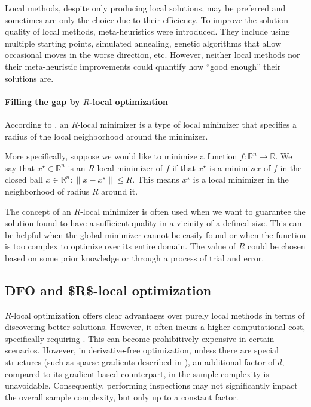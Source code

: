 Local methods, despite only producing local solutions, may be preferred and sometimes are only the choice due to their efficiency. 
To improve the solution quality of local methods, meta-heuristics were introduced. They include using multiple starting points, simulated annealing, genetic algorithms that allow occasional moves in the worse direction, etc.
However, neither local methods nor their meta-heuristic improvements could quantify how ``good enough'' their solutions are.

\paragraph{Filling the gap by $R$-local optimization}
According to \cite{chen2019run}, 
an $R$-local minimizer is a type of local minimizer that specifies a radius of the local neighborhood around the minimizer.

More specifically, suppose we would like to minimize a function $f: \mathbb{R}^n \rightarrow \mathbb{R}$. We say that $x^\star\in\mathbb{R}^n$ is an $R$-local minimizer of $f$ if  that $x^\star$ is a  minimizer of $f$ in the closed ball ${x \in \mathbb{R}^n: \|x - x^\star\| \leq R}$.
This means $x^\star$ is a local minimizer in the neighborhood of radius $R$ around it. 

The concept of an $R$-local minimizer is often used when we want to guarantee the solution found to have a sufficient quality in a vicinity of a defined size. This can be helpful when the global minimizer cannot be easily found or when the function is too complex to optimize over its entire domain. The value of $R$ could be chosen based on some prior knowledge or through a process of trial and error.

\subsection{DFO and \$R\$-local optimization}
$R$-local optimization offers clear advantages over purely local methods in terms of discovering better solutions. However, it often incurs a higher computational cost, specifically requiring .
This can become prohibitively expensive in certain scenarios. However, in derivative-free optimization, unless there are special structures (such as sparse gradients described in \cite{cai2020zeroth}), an additional factor of $d$, compared to its gradient-based counterpart, in the sample complexity is unavoidable. Consequently, performing inspections may not significantly impact the overall sample complexity, but only up to a constant factor.
